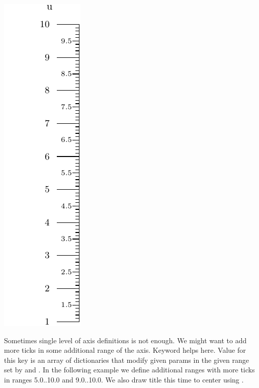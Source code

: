 \documentclass[a4paper,11pt,english]{sphinxmanual}
\begin{document}
\includegraphics{ex_axes_3.pdf}

Sometimes single level of axis definitions is not enough. We might want to add more ticks in some additional range of the axis.
Keyword  helps here. Value for this key is an array of dictionaries that modify given params in the
given range set by  and . In the following example we define additional ranges with more ticks in ranges
5.0..10.0 and 9.0..10.0. We also draw title this time to center using .
\end{document}
